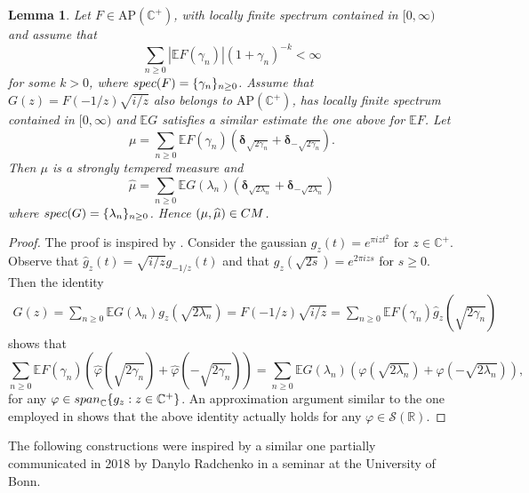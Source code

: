 \documentclass[a4paper,reqno,12pt]{amsart}
\newtheorem{lemma}[theorem]{Lemma}
\newcommand{\E}{\mathcal{E}}
\renewcommand{\H}{\mathbb{C}^+}
\renewcommand{\r}{\mathbb{R}}
\newcommand{\cp}{\mathbb{C}} %
\newcommand{\ft}{\widehat}
\newcommand{\bo}{\boldsymbol}
\newcommand{\la}{\lambda}
\newcommand{\ga}{\gamma}
\newcommand{\p}{\varphi}
\newcommand{\1}{{\bf 1}}
\newcommand{\apc}{\mathrm{AP}(\H)}
\renewcommand{\E}{\mathbb{E}}
\newcommand{\cm}{\rm CM}
\renewcommand{\1}{{\bo 1}}
\newcommand{\del}{{\bo \delta}}
\newcommand{\spec}{{\rm spec}}
\begin{document}
\begin{lemma}\label{lem:FG}
Let $F\in \apc$, with locally finite spectrum contained in $[0,\infty)$ and assume that 
$$
\sum_{n\geq 0} |\E F(\ga_n)|(1+\ga_n)^{-k}<\infty
$$
for some $k>0$, where $\spec(F)=\{\ga_n\}_{n\geq 0}$. Assume that $G(z)=F(-1/z)\sqrt{i/z}$ also belongs to $\apc$,  has locally finite spectrum contained in $[0,\infty)$ and $\E G$ satisfies a similar estimate the one above for $\E F$. Let
$$
\mu = \sum_{n\geq 0} \E F(\ga_n)(\del_{\sqrt{2\ga_n}}+\del_{-\sqrt{2\ga_n}}).
$$
Then $\mu$ is a strongly tempered measure and
$$
\ft \mu = \sum_{n\geq 0} \E G(\la_n)(\del_{\sqrt{2\la_n}}+\del_{-\sqrt{2\la_n}})
$$
where $\spec(G)=\{\la_n\}_{n\geq 0}$. Hence $(\mu,\ft \mu)\in \cm$.
\end{lemma}

\begin{proof}
The proof is inspired by \cite[Lemma 2.1]{CG}. Consider the gaussian $g_z(t)=e^{\pi i z t^2}$ for $z\in\H$. Observe that $\ft g_z(t)=\sqrt{i/z}g_{-1/z}(t)$ and that $g_z(\sqrt{2s})=e^{2\pi i z s}$ for $s\geq 0$.  Then the identity
\begin{align*}
G(z)=\sum_{n\geq 0} \E G(\la_n)  g_z(\sqrt{2\la_n}) = F(-1/z)\sqrt{i/z} = \sum_{n\geq 0} \E F(\ga_n) \ft g_{z}(\sqrt{2\ga_n})
\end{align*}
shows that
$$
\sum_{n\geq 0} \E F(\ga_n) (\ft \p(\sqrt{2\ga_n})+\ft \p(-\sqrt{2\ga_n})) = \sum_{n\geq 0} \E G(\la_n) (\p(\sqrt{2\la_n})+\p(-\sqrt{2\la_n})),
$$
for any $\p\in {\rm span}_{\cp}\{g_z : z\in \H\}$. An approximation argument similar to the one employed in \cite[Lemma 2.1]{CG} shows that the above identity actually holds for any $\p\in \mathcal{S}(\r)$.
\end{proof}

The following constructions were inspired by a similar one partially communicated in 2018 by Danylo Radchenko in a seminar at the University of Bonn.
\end{document}
